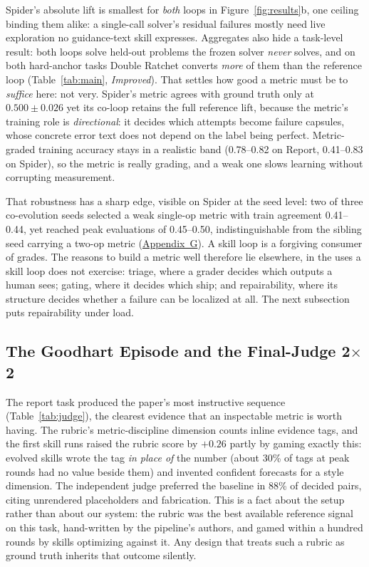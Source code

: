 \documentclass[letterpaper]{article} %
\begin{document}
Spider's absolute lift is smallest for \emph{both} loops in Figure~\ref{fig:results}b, one ceiling binding them alike: a single-call solver's residual failures mostly need live exploration no guidance-text skill expresses. Aggregates also hide a task-level result: both loops solve held-out problems the frozen solver \emph{never} solves, and on both hard-anchor tasks Double Ratchet converts \emph{more} of them than the reference loop (Table~\ref{tab:main}, \emph{Improved}). That settles how good a metric must be to \emph{suffice} here: not very. Spider's metric agrees with ground truth only at $0.500\pm0.026$ yet its co-loop retains the full reference lift, because the metric's training role is \emph{directional}: it decides which attempts become failure capsules, whose concrete error text does not depend on the label being perfect. Metric-graded training accuracy stays in a realistic band (0.78--0.82 on Report, 0.41--0.83 on Spider), so the metric is really grading, and a weak one slows learning without corrupting measurement.

That robustness has a sharp edge, visible on Spider at the seed level: two of three co-evolution seeds selected a weak single-op metric with train agreement 0.41--0.44, yet reached peak evaluations of 0.45--0.50, indistinguishable from the sibling seed carrying a two-op metric (\hyperref[app:negative]{Appendix~G}). A skill loop is a forgiving consumer of grades. The reasons to build a metric well therefore lie elsewhere, in the uses a skill loop does not exercise: triage, where a grader decides which outputs a human sees; gating, where it decides which ship; and repairability, where its structure decides whether a failure can be localized at all. The next subsection puts repairability under load.

\subsection{The Goodhart Episode and the Final-Judge 2$\times$2}
\label{sec:goodhart}

The report task produced the paper's most instructive sequence (Table~\ref{tab:judge}), the clearest evidence that an inspectable metric is worth having. The rubric's metric-discipline dimension counts inline evidence tags, and the first skill runs raised the rubric score by $+0.26$ partly by gaming exactly this: evolved skills wrote the tag \emph{in place of} the number (about 30\% of tags at peak rounds had no value beside them) and invented confident forecasts for a style dimension. The independent judge preferred the baseline in 88\% of decided pairs, citing unrendered placeholders and fabrication. This is a fact about the setup rather than about our system: the rubric was the best available reference signal on this task, hand-written by the pipeline's authors, and gamed within a hundred rounds by skills optimizing against it. Any design that treats such a rubric as ground truth inherits that outcome silently.
\end{document}
